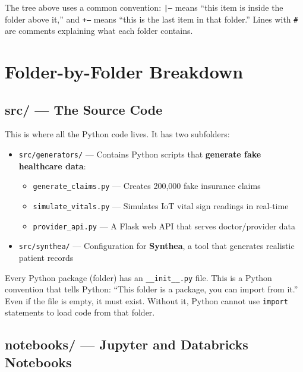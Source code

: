 \documentclass[12pt, a4paper, oneside]{report}
\begin{document}
\begin{notebox}
    The tree above uses a common convention: \texttt{|--} means ``this item is inside the folder above it,'' and \texttt{+--} means ``this is the last item in that folder.'' Lines with \texttt{\#} are comments explaining what each folder contains.
\end{notebox}

\section{Folder-by-Folder Breakdown}

\subsection{src/ --- The Source Code}

This is where all the Python code lives. It has two subfolders:

\begin{itemize}
    \item \texttt{src/generators/} --- Contains Python scripts that \textbf{generate fake healthcare data}:
    \begin{itemize}
        \item \texttt{generate\_claims.py} --- Creates 200,000 fake insurance claims
        \item \texttt{simulate\_vitals.py} --- Simulates IoT vital sign readings in real-time
        \item \texttt{provider\_api.py} --- A Flask web API that serves doctor/provider data
    \end{itemize}
    \item \texttt{src/synthea/} --- Configuration for \textbf{Synthea}, a tool that generates realistic patient records
\end{itemize}

\begin{tipbox}
    Every Python package (folder) has an \texttt{\_\_init\_\_.py} file. This is a Python convention that tells Python: ``This folder is a package, you can import from it.'' Even if the file is empty, it must exist. Without it, Python cannot use \texttt{import} statements to load code from that folder.
\end{tipbox}

\subsection{notebooks/ --- Jupyter and Databricks Notebooks}
\end{document}
